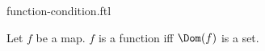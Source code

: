 \documentclass{stex}
\begin{document}
\begin{smodule}{function-condition.ftl}


\begin{forthel}
  \begin{axiom*}
    Let $f$ be a map.
    $f$ is a function iff $\Dom(f)$ is a set.
  \end{axiom*}
\end{forthel}

\end{smodule}
\end{document}
